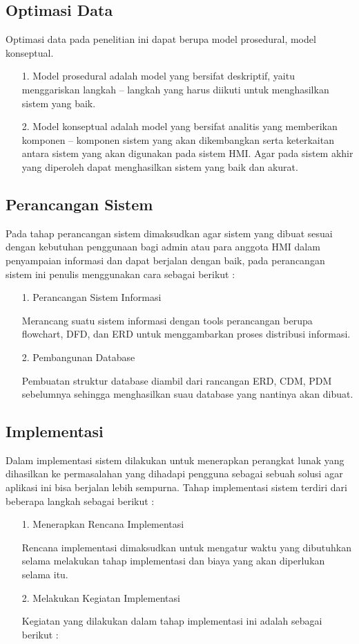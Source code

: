 \documentclass{jtetiproposalskripsi}
\begin{document}
\subsection{Optimasi Data}
Optimasi data pada penelitian ini dapat berupa model prosedural, model konseptual. 
\begin{itemize}

\item[1.]	Model prosedural adalah model yang bersifat deskriptif, yaitu menggariskan langkah – langkah yang harus diikuti untuk menghasilkan sistem yang baik. 
\item[2.]	Model konseptual adalah model yang bersifat analitis yang memberikan komponen – komponen sistem yang akan dikembangkan serta keterkaitan antara sistem yang akan digunakan pada sistem HMI. Agar pada sistem akhir yang diperoleh dapat menghasilkan sistem yang baik dan akurat.
\end{itemize}

\subsection{Perancangan Sistem}
Pada tahap perancangan sistem dimaksudkan agar sistem yang dibuat sesuai dengan kebutuhan penggunaan bagi admin atau para anggota HMI dalam penyampaian informasi dan dapat berjalan dengan baik, pada perancangan sistem ini penulis menggunakan cara sebagai berikut :
\begin{itemize}

\item[1.]	Perancangan Sistem Informasi

Merancang suatu sistem informasi dengan tools perancangan berupa flowchart, DFD, dan ERD untuk menggambarkan proses distribusi informasi.

\item[2.]	Pembangunan Database

Pembuatan struktur database diambil dari rancangan ERD, CDM, PDM sebelumnya sehingga menghasilkan suau database yang nantinya akan dibuat.
\end{itemize}

\subsection{Implementasi}
Dalam implementasi sistem dilakukan untuk menerapkan perangkat lunak yang dihasilkan ke permasalahan yang dihadapi pengguna sebagai sebuah solusi agar aplikasi ini bisa berjalan lebih sempurna. Tahap implementasi sistem terdiri dari beberapa langkah sebagai berikut :
\begin{itemize}

\item[1.]	Menerapkan Rencana Implementasi

Rencana implementasi dimaksudkan untuk mengatur waktu yang dibutuhkan selama melakukan tahap implementasi dan biaya yang akan diperlukan selama itu.

\item[2.]	Melakukan Kegiatan Implementasi

Kegiatan yang dilakukan dalam tahap implementasi ini adalah sebagai berikut :
\end{itemize}
\end{document}

